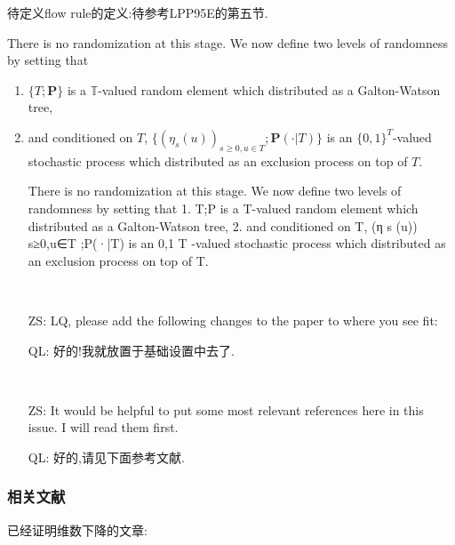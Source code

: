 \documentclass[a4paper,oneside]{ctexbook}
\begin{document}
			待定义flow rule的定义:待参考LPP95E的第五节.

			
			
			There is no randomization at this stage. 
			We now define two levels of randomness by setting that 
			\begin{enumerate}
			\item
			$\{T; \mathbf P\}$ is a $\mathbb T$-valued random element which distributed as a Galton-Watson tree,
			\item
			and conditioned on $T$, $\{(\eta_s(u))_{s\geq 0,u \in T}; \mathbf P(\cdot| T)\}$ is an $\{0,1\}^{T}$-valued stochastic process which distributed as an exclusion process on top of $T$.

			There is no randomization at this stage. We now define two levels of randomness by
			setting that
			1. {T;P} is a T-valued random element which distributed as a Galton-Watson tree,
			2. and conditioned on T, {(η s (u)) s≥0,u∈T ;P(·|T)} is an {0,1} T -valued stochastic
			process which distributed as an exclusion process on top of T.
      

\end{enumerate}
	


	\begin{iss}[Open] ~
        \begin{itemize}
        \item[ZS:]
          LQ, please add the following changes to the paper to where you see fit:
        \item[QL:]
        	好的!我就放置于基础设置中去了.
        \end{itemize}
      \end{iss}


      \begin{iss}[Open]~
        \begin{itemize}
        \item[ZS:]
It would be helpful to put some most relevant references here in this issue.
I will read them first.
		\item[QL:]
			好的,请见下面参考文献.
        \end{itemize}
      \end{iss}

    	\subsubsection*{相关文献}

			已经证明维数下降的文章:
\end{document}
